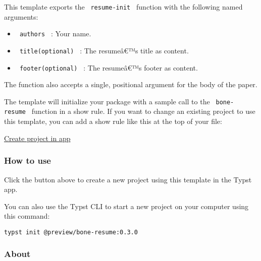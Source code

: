 This template exports the \texttt{\ resume-init\ } function with the
following named arguments:

\begin{itemize}
\tightlist
\item
  \texttt{\ authors\ } : Your name.
\item
  \texttt{\ title(optional)\ } : The resumeâ€™s title as content.
\item
  \texttt{\ footer(optional)\ } : The resumeâ€™s footer as content.
\end{itemize}

The function also accepts a single, positional argument for the body of
the paper.

The template will initialize your package with a sample call to the
\texttt{\ bone-resume\ } function in a show rule. If you want to change
an existing project to use this template, you can add a show rule like
this at the top of your file:

\begin{Shaded}
\begin{Highlighting}[]

\NormalTok{)}


\end{Highlighting}
\end{Shaded}

\href{/app?template=bone-resume&version=0.3.0}{Create project in app}

\subsubsection{How to use}\label{how-to-use}

Click the button above to create a new project using this template in
the Typst app.

You can also use the Typst CLI to start a new project on your computer
using this command:

\begin{verbatim}
typst init @preview/bone-resume:0.3.0
\end{verbatim}



\subsubsection{About}\label{about}


